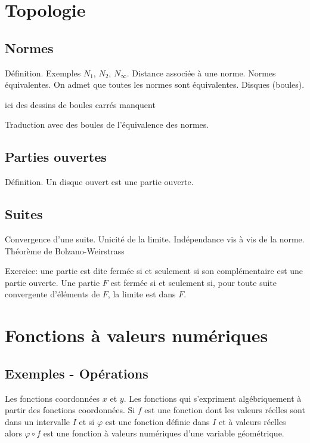 

\section{Topologie}
\subsection{Normes}
Définition. Exemples $N_1$, $N_2$, $N_\infty$. Distance associée à une norme.
Normes équivalentes. On admet que toutes les normes sont équivalentes.
Disques (boules). \newline

ici des dessins de boules carrés manquent

Traduction avec des boules de l'équivalence des normes.

\subsection{Parties ouvertes}
Définition. Un disque ouvert est une partie ouverte.

\subsection{Suites}
Convergence d'une suite. Unicité de la limite. Indépendance vis à vis de la norme.
Théorème de Bolzano-Weirstrass

Exercice: une partie est dite fermée si et seulement si son complémentaire est une partie ouverte. Une partie $F$ est fermée si et seulement si, pour toute suite convergente d'éléments de $F$, la limite est dans $F$.

\section{Fonctions à valeurs numériques}
\subsection{Exemples - Opérations}

Les fonctions coordonnées $x$ et $y$. Les fonctions qui s'expriment algébriquement à partir des fonctions coordonnées.
Si $f$ est une fonction dont les valeurs réelles sont dans un intervalle $I$ et si $\varphi$ est une fonction définie dans $I$ et à valeurs réelles alors $\varphi \circ f$ est une fonction à valeurs numériques d'une variable géométrique.

